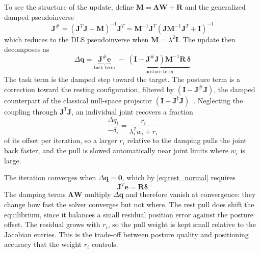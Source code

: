 \documentclass[12pt,a4paper]{article}
\begin{document}
To see the structure of the update, define $\mathbf{M}=\boldsymbol{\Lambda}\mathbf{W}+\mathbf{R}$ and the generalized damped pseudoinverse
\begin{equation}
    \mathbf{J}^{\#}
    = \left(\mathbf{J}^{T}\mathbf{J}+\mathbf{M}\right)^{-1}\mathbf{J}^{T}
    = \mathbf{M}^{-1}\mathbf{J}^{T}\left(\mathbf{J}\mathbf{M}^{-1}\mathbf{J}^{T}+\mathbf{I}\right)^{-1}
\end{equation}
\newpage
which reduces to the DLS pseudoinverse when $\mathbf{M}=\lambda^2\mathbf{I}$. The update then decomposes as
\begin{equation}
    \Delta\mathbf{q}
    = \underbrace{\mathbf{J}^{\#}\mathbf{e}}_{\text{task term}}
    \;-\;
    \underbrace{\left(\mathbf{I}-\mathbf{J}^{\#}\mathbf{J}\right)\mathbf{M}^{-1}\mathbf{R}\,\boldsymbol{\delta}}_{\text{posture term}}
    \label{eq:rest_decomposition}
\end{equation}
The task term is the damped step toward the target. The posture term is a correction toward the resting configuration, filtered by $(\mathbf{I}-\mathbf{J}^{\#}\mathbf{J})$, the damped counterpart of the classical null-space projector $(\mathbf{I}-\mathbf{J}^{\dagger}\mathbf{J})$~\cite{schinstock1994}. Neglecting the coupling through $\mathbf{J}^{T}\mathbf{J}$, an individual joint recovers a fraction
\begin{equation}
    \frac{\Delta q_i}{-\delta_i} = \frac{r_i}{\lambda_i^2 w_i + r_i}
\end{equation}
of its offset per iteration, so a larger $r_i$ relative to the damping pulls the joint back faster, and the pull is slowed automatically near joint limits where $w_i$ is large.

The iteration converges when $\Delta\mathbf{q}=\mathbf{0}$, which by \eqref{eq:rest_normal} requires
\begin{equation}
    \mathbf{J}^{T}\mathbf{e} = \mathbf{R}\boldsymbol{\delta}
\end{equation}
The damping terms $\boldsymbol{\Lambda}\mathbf{W}$ multiply $\Delta\mathbf{q}$ and therefore vanish at convergence: they change how fast the solver converges but not where. The rest pull does shift the equilibrium, since it balances a small residual position error against the posture offset. The residual grows with $r_i$, so the pull weight is kept small relative to the Jacobian entries. This is the trade-off between posture quality and positioning accuracy that the weight $r_i$ controls.



\newpage
\end{document}
